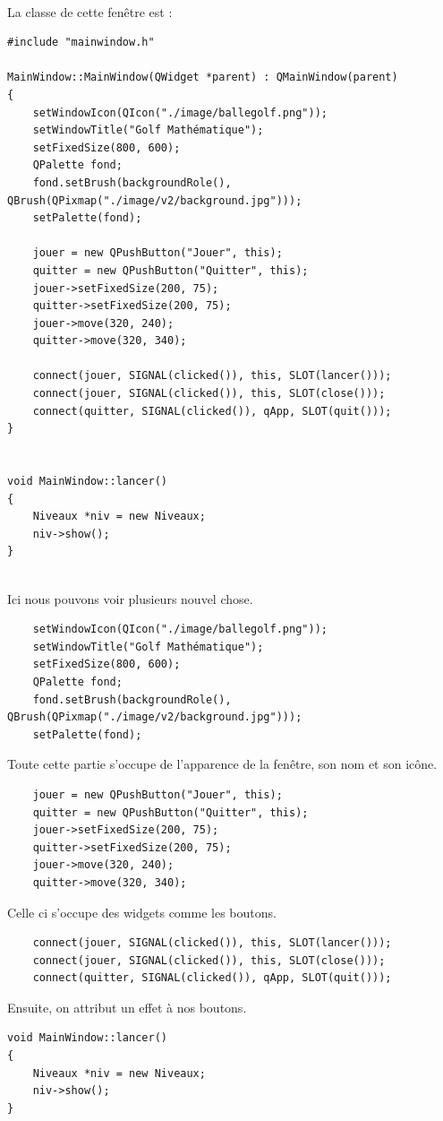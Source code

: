\documentclass{article}
\begin{document}
~\\
La classe de cette fenêtre est :
\begin{verbatim}
#include "mainwindow.h"

MainWindow::MainWindow(QWidget *parent) : QMainWindow(parent)
{
    setWindowIcon(QIcon("./image/ballegolf.png"));
    setWindowTitle("Golf Mathématique");
    setFixedSize(800, 600);
    QPalette fond;
    fond.setBrush(backgroundRole(), QBrush(QPixmap("./image/v2/background.jpg")));
    setPalette(fond);

    jouer = new QPushButton("Jouer", this);
    quitter = new QPushButton("Quitter", this);
    jouer->setFixedSize(200, 75);
    quitter->setFixedSize(200, 75);
    jouer->move(320, 240);
    quitter->move(320, 340);

    connect(jouer, SIGNAL(clicked()), this, SLOT(lancer()));
    connect(jouer, SIGNAL(clicked()), this, SLOT(close()));
    connect(quitter, SIGNAL(clicked()), qApp, SLOT(quit()));
}


void MainWindow::lancer()
{
    Niveaux *niv = new Niveaux;
    niv->show();
}
\end{verbatim}
~\\
Ici nous pouvons voir plusieurs nouvel chose. 
\begin{verbatim}
	setWindowIcon(QIcon("./image/ballegolf.png"));
    setWindowTitle("Golf Mathématique");
    setFixedSize(800, 600);
    QPalette fond;
    fond.setBrush(backgroundRole(), QBrush(QPixmap("./image/v2/background.jpg")));
    setPalette(fond);
\end{verbatim}
Toute cette partie s'occupe de l'apparence de la fenêtre, son nom et son icône.
\begin{verbatim}
    jouer = new QPushButton("Jouer", this);
    quitter = new QPushButton("Quitter", this);
    jouer->setFixedSize(200, 75);
    quitter->setFixedSize(200, 75);
    jouer->move(320, 240);
    quitter->move(320, 340);
\end{verbatim}
Celle ci s'occupe des widgets comme les boutons.
\begin{verbatim}
    connect(jouer, SIGNAL(clicked()), this, SLOT(lancer()));
    connect(jouer, SIGNAL(clicked()), this, SLOT(close()));
    connect(quitter, SIGNAL(clicked()), qApp, SLOT(quit()));
\end{verbatim}
Ensuite, on attribut un effet à nos boutons.
\begin{verbatim}
void MainWindow::lancer()
{
    Niveaux *niv = new Niveaux;
    niv->show();
}
\end{verbatim}
\end{document}
